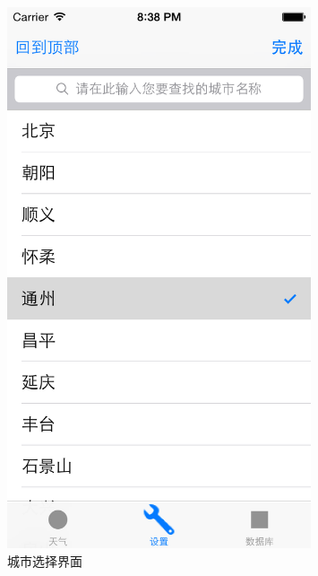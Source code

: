 \documentclass[UTF8,nofonts]{ctexart}
\begin{document}
\begin{figure}[hbt]
\centering
\includegraphics[width=0.8\textwidth]{3.png}
\caption{城市选择界面}
\end{figure}
\end{document}
